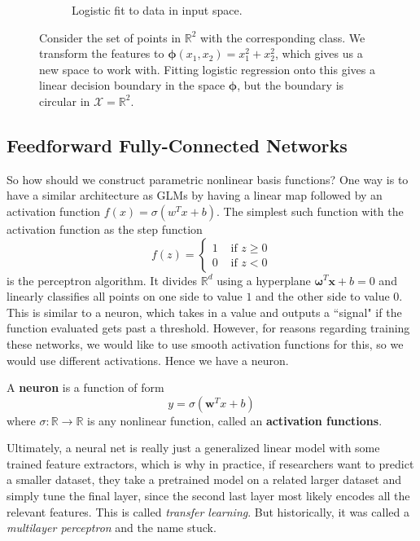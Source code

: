 \documentclass{article}
\begin{document}
\begin{figure}[H]
\begin{subfigure}[t]{0.24\textwidth}
      \caption{Logistic fit to data in input space.}
      \label{fig:raw_trained}
    \end{subfigure}
    \caption{Consider the set of points in $\mathbb{R}^2$ with the corresponding class. We transform the features to $\boldsymbol{\phi}(x_1, x_2) = x_1^2 + x_2^2$, which gives us a new space to work with. Fitting logistic regression onto this gives a linear decision boundary in the space $\boldsymbol{\phi}$, but the boundary is circular in $\mathcal{X} = \mathbb{R}^2$.}
    \label{fig:logistic_transformed}
  \end{figure}

\subsection{Feedforward Fully-Connected Networks}

  So how should we construct parametric nonlinear basis functions? One way is to have a similar architecture as GLMs by having a linear map followed by an activation function $f(x) = \sigma(w^T x + b)$. The simplest such function with the activation function as the step function 
  \begin{equation}
    f(z) = \begin{cases} 1 & \text{ if } z \geq 0 \\ 0 & \text{ if } z < 0 \end{cases}
  \end{equation}
  is the perceptron algorithm. It divides $\mathbb{R}^d$ using a hyperplane $\boldsymbol{\omega}^T \mathbf{x} + b = 0$ and linearly classifies all points on one side to value $1$ and the other side to value $0$. This is similar to a neuron, which takes in a value and outputs a ``signal" if the function evaluated gets past a threshold. However, for reasons regarding training these networks, we would like to use smooth activation functions for this, so we would use different activations. Hence we have a neuron. 

  \begin{definition}[Neuron]
    A \textbf{neuron} is a function of form 
    \begin{equation}
      y = \sigma(\mathbf{w}^T x  + b)
    \end{equation}
    where $\sigma: \mathbb{R} \rightarrow \mathbb{R}$ is any nonlinear function, called an \textbf{activation functions}. 
  \end{definition}
  
  Ultimately, a neural net is really just a generalized linear model with some trained feature extractors, which is why in practice, if researchers want to predict a smaller dataset, they take a pretrained model on a related larger dataset and simply tune the final layer, since the second last layer most likely encodes all the relevant features. This is called \textit{transfer learning}. But historically, it was called a \textit{multilayer perceptron} and the name stuck. 
\end{document}
